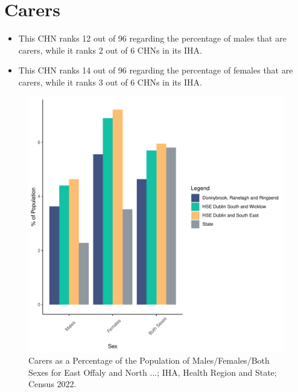 \documentclass{article}
\begin{document}
\section{Carers}\label{sect:Carers}
\begin{itemize}
\item This CHN ranks  12 out of 96 regarding the percentage of males that are carers, while it ranks   2 out of 6 CHNs in its IHA.
\item This CHN ranks  14 out of 96 regarding the percentage of females that are carers, while it ranks   3 out of 6 CHNs in its IHA.
\end{itemize}
\begin{figure}[H]
	\centering
	\includegraphics[width = 150mm]{../figures/CareED.pdf}
	\caption{Carers as a Percentage of the Population of Males/Females/Both Sexes for East Offaly and North ...; IHA, Health Region and State; Census 2022.}
	\label{fig:2ae19629-1a6a-13a3-e055-000000000001}
	\end{figure}
\end{document}
